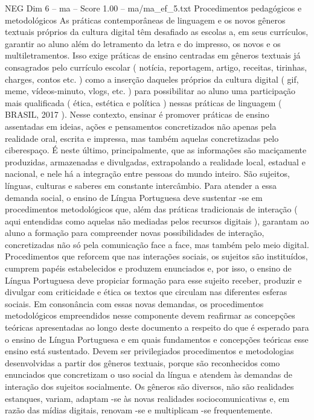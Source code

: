 \begin{textsample}{NEG Dim 6 – ma – Score 1.00 – ma/ma\_ef\_5.txt}  \label{ex:f6_neg_195}
Procedimentos pedagógicos e metodológicos As práticas contemporâneas de linguagem e os novos gêneros textuais próprios da cultura digital têm desafiado as escolas a, em seus currículos, garantir ao aluno além do letramento da letra e do impresso, os novos e os multiletramentos.
Isso exige práticas de ensino centradas em gêneros textuais já consagrados pelo currículo escolar ( notícia, reportagem, artigo, receitas, tirinhas, charges, contos etc. ) como a inserção daqueles próprios da cultura digital ( gif, meme, vídeos-minuto, vlogs, etc. ) para possibilitar ao aluno uma participação mais qualificada ( ética, estética e política ) nessas práticas de linguagem ( BRASIL, 2017 ).
Nesse contexto, ensinar é promover práticas de ensino assentadas em ideias, ações e pensamentos concretizados não apenas pela realidade oral, escrita e impressa, mas também aquelas concretizadas pelo ciberespaço.
É neste último, principalmente, que as informações são maciçamente produzidas, armazenadas e divulgadas, extrapolando a realidade local, estadual e nacional, e nele há a integração entre pessoas do mundo inteiro.
São sujeitos, línguas, culturas e saberes em constante intercâmbio.
Para atender a essa demanda social, o ensino de Língua Portuguesa deve sustentar -se em procedimentos metodológicos que, além das práticas tradicionais de interação ( aqui entendidas como aquelas não mediadas pelos recursos digitais ), garantam ao aluno a formação para compreender novas possibilidades de interação, concretizadas não só pela comunicação face a face, mas também pelo meio digital.
Procedimentos que reforcem que nas interações sociais, os sujeitos são instituídos, cumprem papéis estabelecidos e produzem enunciados e, por isso, o ensino de Língua Portuguesa deve propiciar formação para esse sujeito receber, produzir e divulgar com criticidade e ética os textos que circulam nas diferentes esferas sociais.
Em consonância com essas novas demandas, os procedimentos metodológicos empreendidos nesse componente devem reafirmar as concepções teóricas apresentadas ao longo deste documento a respeito do que é esperado para o ensino de Língua Portuguesa e em quais fundamentos e concepções teóricas esse ensino está sustentado.
Devem ser privilegiados procedimentos e metodologias desenvolvidas a partir dos gêneros textuais, porque são reconhecidos como enunciados que concretizam o uso social da língua e atendem às demandas de interação dos sujeitos socialmente.
Os gêneros são diversos, não são realidades estanques, variam, adaptam -se às novas realidades sociocomunicativas e, em razão das mídias digitais, renovam -se e multiplicam -se frequentemente.

\end{textsample}

